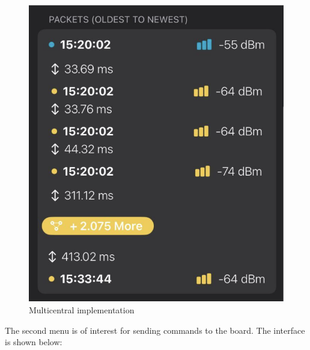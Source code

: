\documentclass{Configuration_Files/PoliMi3i_thesis}
\begin{document}
\begin{figure}[H]
    \centering
    \includegraphics[scale=0.6]{Multicentral/10.png}
    \caption{Multicentral implementation}
    \label{multicentral_10}
\end{figure}

The second menu is of interest for sending commands to the board. The interface is shown below:
\end{document}
